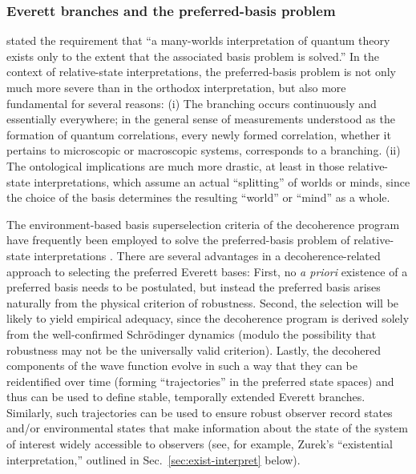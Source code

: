 \documentclass[rmp,aps,amsmath,amsfonts,noshowkeys,noshowpacs,12pt]{revtex4}
\begin{document}
\subsubsection{Everett branches and the preferred-basis problem}

\citet[p.~1043]{Stapp:2002:pc} stated the requirement that ``a
many-worlds interpretation of quantum theory exists only to the extent
that the associated basis problem is solved.'' In the context of
relative-state interpretations, the preferred-basis problem is not
only much more severe than in the orthodox interpretation, but also
more fundamental for several reasons: (i) The branching occurs
continuously and essentially everywhere; in the general sense of
measurements understood as the formation of quantum correlations,
every newly formed correlation, whether it pertains to microscopic or
macroscopic systems, corresponds to a branching. (ii) The ontological
implications are much more drastic, at least in those relative-state
interpretations, which assume an actual ``splitting'' of worlds or
minds, since the choice of the basis determines the resulting
``world'' or ``mind'' as a whole.

The environment-based basis superselection criteria of the decoherence
program have frequently been employed to solve the preferred-basis
problem of relative-state interpretations \citep[see, for
example,][]{Zurek:1998:re,Butterfield:2001:ua,Wallace:2003:iq,Wallace:2003:iz}.
There are several advantages in a decoherence-related approach to
selecting the preferred Everett bases: First, no \emph{a priori}
existence of a preferred basis needs to be postulated, but instead the
preferred basis arises naturally from the physical criterion of
robustness.  Second, the selection will be likely to yield empirical
adequacy, since the decoherence program is derived solely from the
well-confirmed Schr\"odinger dynamics (modulo the possibility that
robustness may not be the universally valid criterion).  Lastly, the
decohered components of the wave function evolve in such a way that
they can be reidentified over time (forming ``trajectories'' in the
preferred state spaces) and thus can be used to define stable,
temporally extended Everett branches. Similarly, such trajectories can
be used to ensure robust observer record states and/or environmental
states that make information about the state of the system of interest
widely accessible to observers (see, for example, Zurek's
``existential interpretation,'' outlined in
Sec.~\ref{sec:exist-interpret} below).
\end{document}
